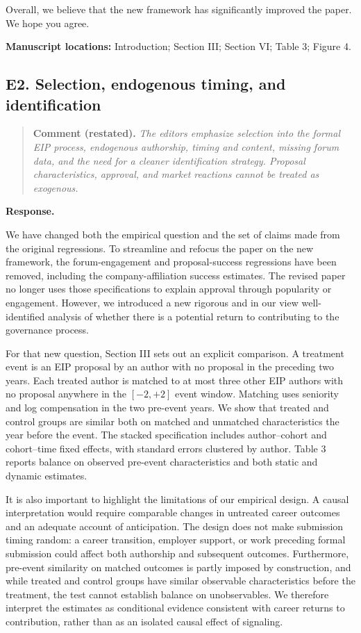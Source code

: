 \documentclass[11pt,letterpaper]{article}
\newcommand{\point}[3]{%
  \Needspace{7\baselineskip}
  \subsection*{#1. #2}\phantomsection\label{pt:#1}%
  \begin{quote}\small\textbf{Comment (restated).} \textit{#3}\end{quote}%
  \textbf{Response.}\enspace\ignorespaces}
\newcommand{\locations}[1]{\par{\small\textbf{Manuscript locations:} #1.}\par}
\begin{document}
Overall, we believe that the new framework has significantly improved the paper. We hope you agree. 



\locations{Introduction; Section III; Section VI; Table 3; Figure 4}

\point{E2}{Selection, endogenous timing, and identification}{The editors emphasize selection into the formal EIP process, endogenous authorship, timing and content, missing forum data, and the need for a cleaner identification strategy. Proposal characteristics, approval, and market reactions cannot be treated as exogenous.}

We have changed both the empirical question and the set of claims made from the original regressions. To streamline and refocus the paper on the new framework, the forum-engagement and proposal-success regressions have been removed, including the company-affiliation success estimates. The revised paper no longer uses those specifications to explain approval through popularity or engagement. However, we introduced a new rigorous and in our view well-identified analysis of whether there is a potential return to contributing to the governance process. 

For that new question, Section III sets out an explicit comparison. A treatment event is an EIP proposal by an author with no proposal in the preceding two years. Each treated author is matched to at most three other EIP authors with no proposal anywhere in the $[-2,+2]$ event window. Matching uses seniority and log compensation in the two pre-event years. We show that treated and control groups are similar both on matched and unmatched characteristics the year before the event. The stacked specification includes author--cohort and cohort--time fixed effects, with standard errors clustered by author. Table 3 reports balance on observed pre-event characteristics and both static and dynamic estimates.

It is also important to highlight the limitations of our empirical design. A causal interpretation would require comparable changes in untreated career outcomes and an adequate account of anticipation. The design does not make submission timing random: a career transition, employer support, or work preceding formal submission could affect both authorship and subsequent outcomes. Furthermore, pre-event similarity on matched outcomes is partly imposed by construction, and while treated and control groups have similar observable characteristics before the treatment, the test cannot establish balance on unobservables. We therefore interpret the estimates as conditional evidence consistent with career returns to contribution, rather than as an isolated causal effect of signaling.
\end{document}
